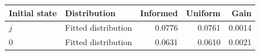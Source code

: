 \begin{tabular}{llrrr}\toprule
Initial state & Distribution & Informed & Uniform & Gain\\\midrule
$j$ & Fitted distribution & 0.0776 & 0.0761 & 0.0014 \\
$0$ & Fitted distribution & 0.0631 & 0.0610 & 0.0021 \\
\bottomrule\end{tabular}
